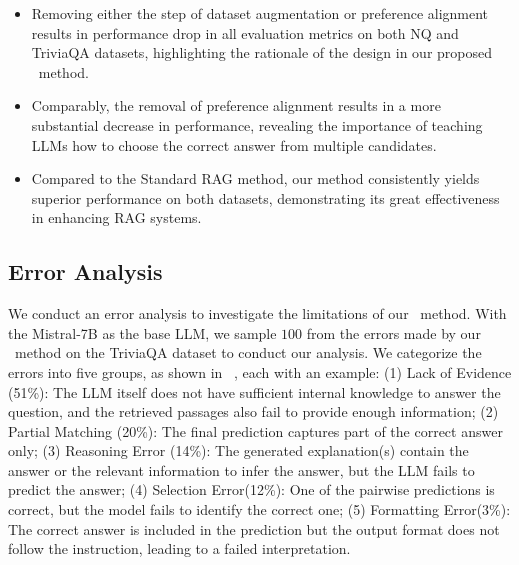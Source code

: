 \begin{itemize}[leftmargin=*,nosep]
\item Removing either the step of dataset augmentation or preference alignment results in performance drop in all evaluation metrics on both NQ and TriviaQA datasets, highlighting the rationale of the design in our proposed \approach~method. 
\item Comparably, the removal of preference alignment results in a more substantial decrease in performance, revealing the importance of teaching LLMs how to choose the correct answer from multiple candidates.
\item Compared to the Standard RAG method, our method consistently yields superior performance on both datasets, demonstrating its great effectiveness in enhancing RAG systems. 

\end{itemize}

\subsection{Error Analysis}
We conduct an error analysis to investigate the limitations of our \approach~method. 
With the Mistral-7B as the base LLM, we sample $100$ from the errors made by our \approach~method on the TriviaQA dataset to conduct our analysis. 
We categorize the errors into five groups, as shown in ~, each with an example:
(1) Lack of Evidence (51\%): The LLM itself does not have sufficient internal knowledge to answer the question, and the retrieved passages also fail to provide enough information;
(2) Partial Matching (20\%): The final prediction captures part of the correct answer only;
(3) Reasoning Error (14\%): The generated explanation(s) contain the answer or the relevant information to infer the answer, but the LLM fails to predict the answer;
(4) Selection Error(12\%): One of the pairwise predictions is correct,  but the model fails to identify the correct one;
(5) Formatting Error(3\%): The correct answer is included in the prediction but the output format does not follow the instruction, leading to a failed interpretation.



